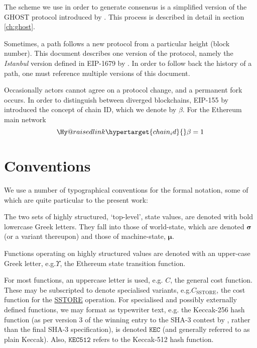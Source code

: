 \documentclass[9pt,oneside]{amsart}
\makeatletter
\newcommand{\linkdest}[1]{\Hy@raisedlink{\hypertarget{#1}{}}}
\newcommand*\eg{e.g.\@\xspace}
\makeatother
\begin{document}
\begin{multicols}{2}
The scheme we use in order to generate consensus is a simplified version of the GHOST protocol introduced by \cite{cryptoeprint:2013:881}. This process is described in detail in section \ref{ch:ghost}.

Sometimes, a path follows a new protocol from a particular height (block number).
This document describes one version of the protocol, namely the \textit{Istanbul} version defined in EIP-1679 by \cite{EIP-1679}.
In order to follow back the history of a path, one must reference multiple versions of this document.

Occasionally actors cannot agree on a protocol change, and a permanent fork occurs.
In order to distinguish between diverged blockchains, EIP-155 by \cite{EIP-155} introduced the concept of chain ID, which we denote by $\beta$.
For the Ethereum main network
\begin{equation}
  \linkdest{chain_id}
  \beta = 1
\end{equation}

\section{Conventions}\label{ch:conventions}

We use a number of typographical conventions for the formal notation, some of which are quite particular to the present work:

The two sets of highly structured, `top-level', state values, are denoted with bold lowercase Greek letters. They fall into those of world-state, which are denoted $\boldsymbol{\sigma}$ (or a variant thereupon) and those of machine-state, $\boldsymbol{\mu}$.

Functions operating on highly structured values are denoted with an upper-case Greek letter, \eg \hyperlink{Upsilon_state_transition}{$\Upsilon$}, the Ethereum state transition function.

For most functions, an uppercase letter is used, e.g. $C$, the general cost function. These may be subscripted to denote specialised variants, \eg \hyperlink{C__SSTORE}{$C_\text{SSTORE}$}, the cost function for the \hyperlink{SSTORE}{{\tiny SSTORE}} operation. For specialised and possibly externally defined functions, we may format as typewriter text, \eg the Keccak-256 hash function (as per version 3 of the winning entry to the SHA-3 contest by \cite{Keccak}, rather than the final SHA-3 specification), is denoted $\texttt{KEC}$ (and generally referred to as plain Keccak). Also, $\texttt{KEC512}$ refers to the Keccak-512 hash function.


\end{multicols}
\end{document}
